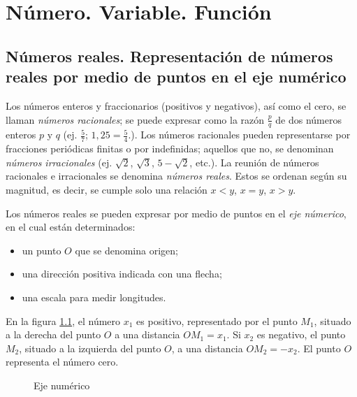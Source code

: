 \chapter{Número. Variable. Función} \label{c:numvarfun}


\section{Números reales. Representación de números reales por medio de puntos en el eje numérico}


Los números enteros y fraccionarios (positivos y negativos), así como el cero, se llaman \emph{números racionales}; se puede expresar como la razón $\frac{p}{q}$ de dos números enteros $p$ y $q$ (ej. $\frac{5}{7}$; $1,25 = \frac{5}{4}$.). Los números racionales pueden representarse por fracciones periódicas finitas o por indefinidas; aquellos que no, se denominan \emph{números irracionales} (ej. $\sqrt{2}$, $\sqrt{3}$, $5 - \sqrt{2}$, etc.). La reunión de números racionales e irracionales se denomina \emph{números reales}. Estos se ordenan según su magnitud, es decir, se cumple solo una relación $x < y$, $x = y$, $x > y$.

Los números reales se pueden expresar por medio de puntos en el \emph{eje númerico}, en el cual están determinados:

\begin{itemize}
\item un punto $O$ que se denomina origen;
\item una dirección positiva indicada con una flecha;
\item una escala para medir longitudes.
\end{itemize}

En la figura \ref{c:numvarfun:eje}, el número $x_1$ es positivo, representado por el punto $M_1$, situado a la derecha del punto $O$ a una distancia $OM_1 = x_1$. Si $x_2$ es negativo, el punto $M_2$, situado a la izquierda del punto $O$, a una distancia $OM_2 = -x_2$. El punto $O$ representa el número cero.

\begin{figure} \label{c:numvarfun:eje}
  \centering


  \caption{Eje numérico}
\end{figure}

